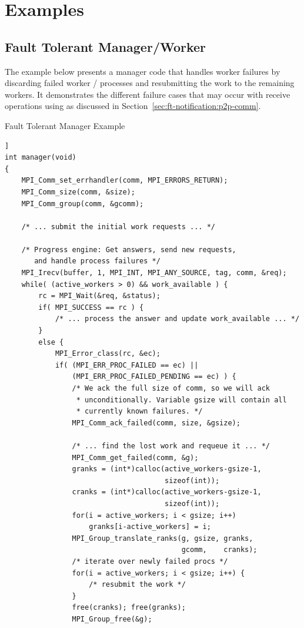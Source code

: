 \section{Examples}

\subsection{Fault Tolerant Manager/Worker}

The example below presents a manager code that handles worker failures
by discarding failed worker \MPI/ processes and resubmitting the work to
the remaining workers. It demonstrates the different failure cases
that may occur with receive operations using 
as discussed in Section~\ref{sec:ft-notification:p2p-comm}.

\begin{example}
\label{ft-ex-manager-worker}
%
Fault Tolerant Manager Example
\begin{lstlisting}[language={[MPI]C}]]
int manager(void)
{
    MPI_Comm_set_errhandler(comm, MPI_ERRORS_RETURN);
    MPI_Comm_size(comm, &size);
    MPI_Comm_group(comm, &gcomm);

    /* ... submit the initial work requests ... */

    /* Progress engine: Get answers, send new requests,
       and handle process failures */
    MPI_Irecv(buffer, 1, MPI_INT, MPI_ANY_SOURCE, tag, comm, &req);
    while( (active_workers > 0) && work_available ) {
        rc = MPI_Wait(&req, &status);
        if( MPI_SUCCESS == rc ) {
            /* ... process the answer and update work_available ... */
        }
        else {
            MPI_Error_class(rc, &ec);
            if( (MPI_ERR_PROC_FAILED == ec) ||
                (MPI_ERR_PROC_FAILED_PENDING == ec) ) {
                /* We ack the full size of comm, so we will ack
                 * unconditionally. Variable gsize will contain all
                 * currently known failures. */
                MPI_Comm_ack_failed(comm, size, &gsize);

                /* ... find the lost work and requeue it ... */
                MPI_Comm_get_failed(comm, &g);
                granks = (int*)calloc(active_workers-gsize-1,
                                      sizeof(int));
                cranks = (int*)calloc(active_workers-gsize-1,
                                      sizeof(int));
                for(i = active_workers; i < gsize; i++)
                    granks[i-active_workers] = i;
                MPI_Group_translate_ranks(g, gsize, granks,
                                          gcomm,    cranks);
                /* iterate over newly failed procs */
                for(i = active_workers; i < gsize; i++) {
                    /* resubmit the work */
                }
                free(cranks); free(granks);
                MPI_Group_free(&g);


\end{lstlisting}
\end{example}

